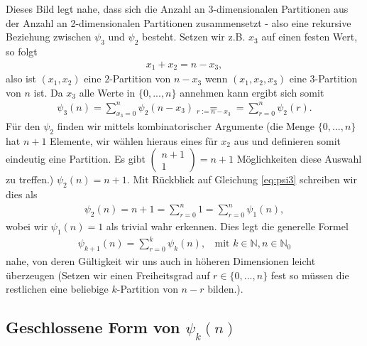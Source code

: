 \documentclass{article}
\begin{document}
Dieses Bild legt nahe, dass sich die Anzahl an 3-dimensionalen Partitionen aus der Anzahl an 2-dimensionalen Partitionen zusammensetzt - also eine rekursive Beziehung zwischen $\psi_3$ und $\psi_2$ besteht. Setzen wir z.B. $x_3$ auf einen festen Wert, so folgt
\begin{align*}
    x_1 + x_2 = n - x_3,
\end{align*}
also ist $(x_1, x_2)$ eine $2$-Partition von $n-x_3$ wenn $(x_1, x_2, x_3)$ eine $3$-Partition von $n$ ist. Da $x_3$ alle Werte in $\{0,...,n\}$ annehmen kann ergibt sich somit
\begin{align}
    \psi_3(n) = \sum_{x_3=0}^n \psi_2(n-x_3) \underset{r:=n-x_3}{=} = \sum_{r=0}^n \psi_2(r) \label{eq:psi3}.
\end{align}
Für den $\psi_2$ finden wir mittels kombinatorischer Argumente (die Menge $\{0,...,n\}$ hat $n+1$ Elemente, wir wählen hieraus eines für $x_2$ aus und definieren somit eindeutig eine Partition. Es gibt $\begin{pmatrix}
        n+1 \\ 1
    \end{pmatrix} = n+1$ Möglichkeiten diese Auswahl zu treffen.) $\psi_2(n) = n+1$. Mit Rückblick auf Gleichung \ref{eq:psi3} schreiben wir dies als
\begin{align}
    \psi_2(n) = n+1 = \sum_{r=0}^n 1 = \sum_{r=0}^n \psi_1(n),
\end{align}
wobei wir $\psi_1(n) = 1$ als trivial wahr erkennen.
Dies legt die generelle Formel
\begin{align}
    \psi_{k+1}(n) = \sum_{r=0}^k \psi_k(n), ~~~~ \text{mit } k \in \mathbb{N}, n \in \mathbb{N}_0 \label{eq:psi_k_recursive}
\end{align}
nahe, von deren Gültigkeit wir uns auch in höheren Dimensionen leicht überzeugen (Setzen wir einen Freiheitsgrad auf $r \in \{0,...,n\}$ fest so müssen die restlichen eine beliebige $k$-Partition von $n-r$ bilden.).

\subsection{Geschlossene Form von $\psi_k(n)$}
\end{document}
